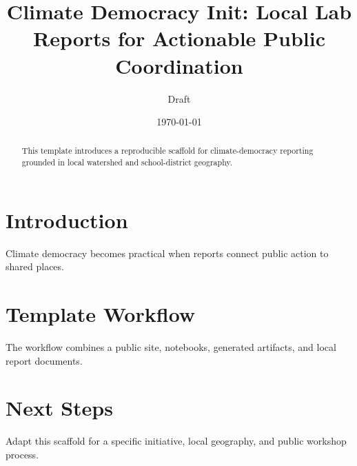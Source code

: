 \documentclass[11pt]{article}
\title{Climate Democracy Init: Local Lab Reports for Actionable Public Coordination}
\author{Draft}
\date{\today}
\begin{document}
\maketitle
\begin{abstract}
This template introduces a reproducible scaffold for climate-democracy reporting grounded in local watershed and school-district geography.
\end{abstract}
\section{Introduction}
Climate democracy becomes practical when reports connect public action to shared places.
\section{Template Workflow}
The workflow combines a public site, notebooks, generated artifacts, and local report documents.
\section{Next Steps}
Adapt this scaffold for a specific initiative, local geography, and public workshop process.
\end{document}
